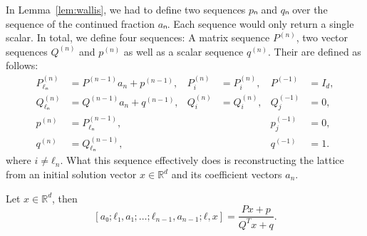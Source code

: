 In Lemma~\vref{lem:wallis}, we had to define two sequences $pₙ$ and $qₙ$ over
the sequence of the continued fraction $aₙ$.
Each sequence would only return a single scalar.
In total, we define four sequences:
A matrix sequence $P^{(n)}$, two vector sequences $Q^{(n)}$ and $p^{(n)}$ as well as a scalar sequence $q^{(n)}$.
Their are defined as follows:
\begin{align*}
  P_{ℓₙ}^{(n)} & = P^{(n-1)} a_n + p^{(n-1)}, & P_i^{(n)} & = P_i^{(n)}, & P^{(-1)}   & = I_d, \\
  Q_{ℓₙ}^{(n)} & = Q^{(n-1)} a_n + q^{(n-1)}, & Q_i^{(n)} & = Q_i^{(n)}, & Q^{(-1)}_j & = 0,   \\
  p^{(n)}      & = P_{ℓₙ}^{(n-1)},            &           &              & p^{(-1)}_j & = 0,   \\
  q^{(n)}      & = Q_{ℓₙ}^{(n-1)},            &           &              & q^{(-1)}   & = 1.
\end{align*}
where $i ≠ ℓ_n$.
What this sequence effectively does is reconstructing the lattice from an
initial solution vector $x ∈ ℝ^d$ and its coefficient vectors $a_n$.

\begin{lemma}[Wallis]
  \label{lem:mdcf-wallis}
  Let $x ∈ ℝ^d$, then
  \[
    [a₀; ℓ₁, a₁; …; ℓ_{n-1}, a_{n-1}; ℓ, x]
    = \frac{P x + p}{Q^T x + q}.
  \]
\end{lemma}


